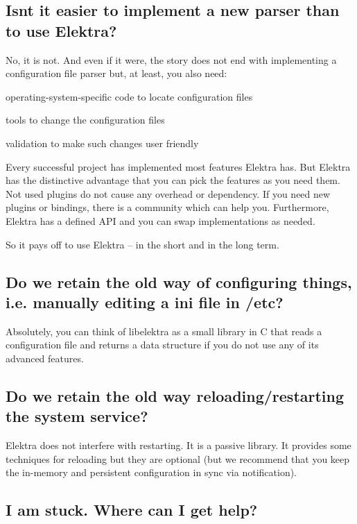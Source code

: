 \subsection*{Isn\textquotesingle{}t it easier to implement a new parser than to use Elektra?}

No, it is not. And even if it were, the story does not end with implementing a configuration file parser but, at least, you also need\+:


\begin{DoxyItemize}
\item operating-\/system-\/specific code to locate configuration files
\item tools to change the configuration files
\item validation to make such changes user friendly
\end{DoxyItemize}

Every successful project has implemented most features Elektra has. But Elektra has the distinctive advantage that you can pick the features as you need them. Not used plugins do not cause any overhead or dependency. If you need new plugins or bindings, there is a community which can help you. Furthermore, Elektra has a defined A\+PI and you can swap implementations as needed.

So it pays off to use Elektra -- in the short and in the long term.

\subsection*{Do we retain the old way of configuring things, i.\+e. manually editing a ini file in /etc?}

Absolutely, you can think of libelektra as a small library in C that reads a configuration file and returns a data structure if you do not use any of its advanced features.

\subsection*{Do we retain the old way reloading/restarting the system service?}

Elektra does not interfere with restarting. It is a passive library. It provides some techniques for reloading but they are optional (but we recommend that you keep the in-\/memory and persistent configuration in sync via notification).

\subsection*{I am stuck. Where can I get help?}

